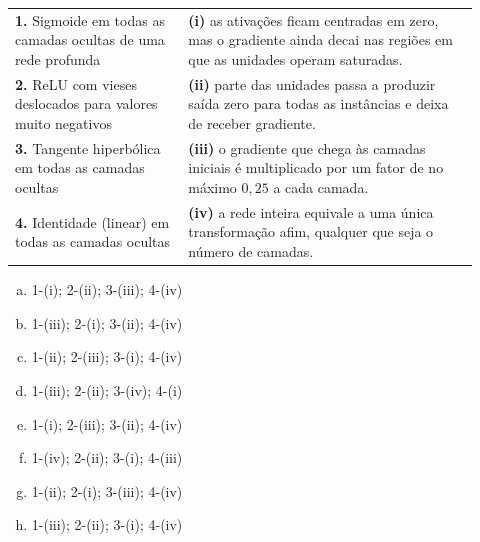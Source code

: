 \documentclass{dlproblemset}
\begin{document}
\begin{enumerate}[1)]
    \begin{center}
    \begin{tabular}{p{0.34\linewidth} p{0.58\linewidth}}
    \textbf{1.} Sigmoide em todas as camadas ocultas de uma rede profunda & \textbf{(i)} as ativações ficam centradas em zero, mas o gradiente ainda decai nas regiões em que as unidades operam saturadas. \\
    \textbf{2.} ReLU com vieses deslocados para valores muito negativos & \textbf{(ii)} parte das unidades passa a produzir saída zero para todas as instâncias e deixa de receber gradiente. \\
    \textbf{3.} Tangente hiperbólica em todas as camadas ocultas & \textbf{(iii)} o gradiente que chega às camadas iniciais é multiplicado por um fator de no máximo $0{,}25$ a cada camada. \\
    \textbf{4.} Identidade (linear) em todas as camadas ocultas & \textbf{(iv)} a rede inteira equivale a uma única transformação afim, qualquer que seja o número de camadas. \\
    \end{tabular}
    \end{center}

    \begin{enumerate}[(a)]
        \item 1-(i); 2-(ii); 3-(iii); 4-(iv)
        \item 1-(iii); 2-(i); 3-(ii); 4-(iv)
        \item 1-(ii); 2-(iii); 3-(i); 4-(iv)
        \item 1-(iii); 2-(ii); 3-(iv); 4-(i)
        \item 1-(i); 2-(iii); 3-(ii); 4-(iv)
        \item 1-(iv); 2-(ii); 3-(i); 4-(iii)
        \item 1-(ii); 2-(i); 3-(iii); 4-(iv)
        \item 1-(iii); 2-(ii); 3-(i); 4-(iv)
    \end{enumerate}


\end{enumerate}
\end{document}
